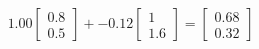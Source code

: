 \documentclass[preview]{standalone}
\begin{document}
\begin{align*}
1.00 \begin{bmatrix} 0.8 \\ 0.5 \end{bmatrix} + -0.12 \begin{bmatrix} 1 \\ 1.6 \end{bmatrix} = \begin{bmatrix} 0.68 \\ 0.32 \end{bmatrix}
\end{align*}
\end{document}
